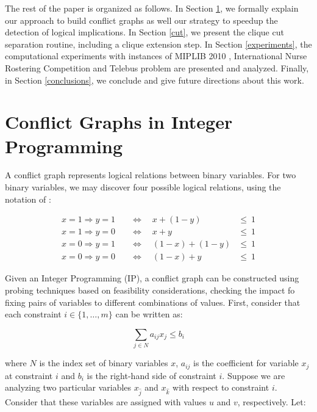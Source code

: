 \documentclass{endm}
\begin{document}
The rest of the paper is organized as follows. In Section \ref{seccgraph}, we formally explain our approach to build conflict graphs as well our strategy to speedup the detection of logical implications. In Section \ref{cut}, we present the clique cut separation routine, including a clique extension step. In Section \ref{experiments}, the computational experiments with instances of MIPLIB 2010 \cite{miplib}, International Nurse Rostering Competition \cite{haspeslagh} and Telebus problem \cite{Borndorfer1998} are presented and analyzed. Finally, in Section \ref{conclusions}, we conclude and give future directions about this work.

\section{Conflict Graphs in Integer Programming}\label{seccgraph}

A conflict graph represents logical relations between binary variables. For two binary variables, we may discover four possible logical relations, using the notation of \cite{atamturk}:


\begin{align}
x = 1 \Rightarrow y = 1 & \quad \Longleftrightarrow \quad x + (1 - y) & \leq \ 1\\
x = 1 \Rightarrow y = 0 & \quad \Longleftrightarrow \quad x + y & \leq \ 1 \\
x = 0 \Rightarrow y = 1 & \quad \Longleftrightarrow \quad (1 - x) + (1 - y) & \leq \ 1 \\
x = 0 \Rightarrow y = 0 & \quad \Longleftrightarrow \quad (1 - x) + y & \leq \ 1
\end{align}



Given an Integer Programming (IP), a conflict graph can be constructed using probing techniques based on feasibility considerations, checking the impact fo fixing pairs of variables to different combinations of values. First, consider that each constraint $i \in \{1,\ldots,m\}$ can be written as:

\begin{equation}
 \sum_{j \in N} a_{ij}x_{j} \leq b_{i} 
\end{equation}

\noindent where $N$ is the index set of binary variables $x$, $a_{ij}$ is the coefficient for variable $x_{j}$ at constraint $i$ and $b_{i}$ is the right-hand side of constraint $i$. Suppose we are analyzing two particular variables $x_{\hat{j}}$ and $x_{\hat{k}}$ with respect to constraint $i$. Consider that these variables are assigned with values $u$ and $v$, respectively. Let:
\end{document}
